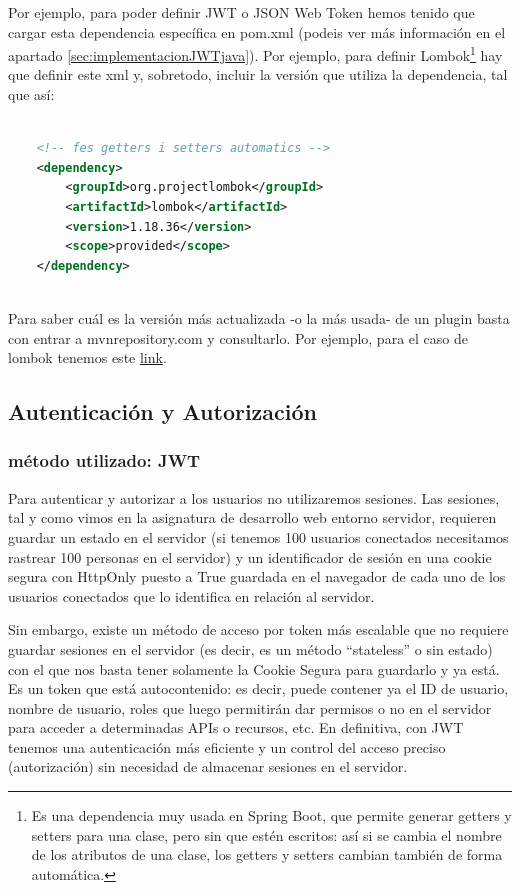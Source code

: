 \documentclass[a4paper,12pt]{report}
\begin{document}
				Por ejemplo, para poder definir JWT o JSON Web Token hemos tenido que cargar esta dependencia específica en pom.xml (podeis ver más información en el apartado \ref{sec:implementacionJWTjava}). Por ejemplo, para definir Lombok\footnote{Es una dependencia muy usada en Spring Boot, que permite generar getters y setters para una clase, pero sin que estén escritos: así si se cambia el nombre de los atributos de una clase, los getters y setters cambian también de forma automática.} hay que definir este xml y, sobretodo, incluir la versión que utiliza la dependencia, tal que así:
				
				
			\begin{lstlisting}[language=XML, basicstyle=\ttfamily\small, keywordstyle=\color{red}]
					
	<!-- fes getters i setters automatics -->
	<dependency>
		<groupId>org.projectlombok</groupId>
		<artifactId>lombok</artifactId>
		<version>1.18.36</version>
		<scope>provided</scope>
	</dependency>
			
			\end{lstlisting}
				 
				
				Para saber cuál es la versión más actualizada -o la más usada- de un plugin basta con entrar a mvnrepository.com y consultarlo. Por ejemplo, para el caso de lombok tenemos este \href{https://mvnrepository.com/artifact/org.projectlombok/lombok}{link}.
			
				
				\subsection{Autenticación y Autorización}
				
				\subsubsection{método utilizado: JWT}
				
				Para autenticar y autorizar a los usuarios no utilizaremos sesiones. Las sesiones, tal y como vimos en la asignatura de desarrollo web entorno servidor, requieren guardar un estado en el servidor (si tenemos 100 usuarios conectados necesitamos rastrear 100 personas en el servidor) y un identificador de sesión en una cookie segura con HttpOnly puesto a True guardada en el navegador de cada uno de los usuarios conectados que lo identifica en relación al servidor.
				
				Sin embargo, existe un método de acceso por token más escalable que no requiere guardar sesiones en el servidor (es decir, es un método ``stateless'' o sin estado) con el que nos basta tener solamente la Cookie Segura para guardarlo y ya está. Es un token que está autocontenido: es decir, puede contener ya el ID de usuario, nombre de usuario, roles que luego permitirán dar permisos o no en el servidor para acceder a determinadas APIs o recursos, etc. En definitiva, con JWT tenemos una autenticación más eficiente y un control del acceso preciso (autorización) sin necesidad de almacenar sesiones en el servidor.
				
\end{document}
